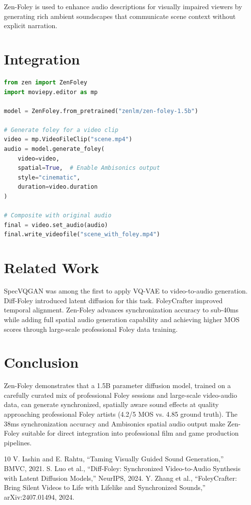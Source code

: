 \documentclass[11pt,a4paper]{article}
\begin{document}
Zen-Foley is used to enhance audio descriptions for visually impaired viewers by generating
rich ambient soundscapes that communicate scene context without explicit narration.

\section{Integration}

\begin{lstlisting}[language=Python, caption=Zen-Foley Video-Conditioned Generation]
from zen import ZenFoley
import moviepy.editor as mp

model = ZenFoley.from_pretrained("zenlm/zen-foley-1.5b")

# Generate foley for a video clip
video = mp.VideoFileClip("scene.mp4")
audio = model.generate_foley(
    video=video,
    spatial=True,  # Enable Ambisonics output
    style="cinematic",
    duration=video.duration
)

# Composite with original audio
final = video.set_audio(audio)
final.write_videofile("scene_with_foley.mp4")
\end{lstlisting}

\section{Related Work}

SpecVQGAN \cite{iashin2021taming} was among the first to apply VQ-VAE to video-to-audio
generation. Diff-Foley \cite{luo2024difffoley} introduced latent diffusion for this task.
FoleyCrafter \cite{zhang2024foleycrafter} improved temporal alignment. Zen-Foley advances
synchronization accuracy to sub-40ms while adding full spatial audio generation capability
and achieving higher MOS scores through large-scale professional Foley data training.

\section{Conclusion}

Zen-Foley demonstrates that a 1.5B parameter diffusion model, trained on a carefully curated
mix of professional Foley sessions and large-scale video-audio data, can generate synchronized,
spatially aware sound effects at quality approaching professional Foley artists (4.2/5 MOS
vs. 4.85 ground truth). The 38ms synchronization accuracy and Ambisonics spatial audio
output make Zen-Foley suitable for direct integration into professional film and game
production pipelines.

\begin{thebibliography}{10}
 V. Iashin and E. Rahtu, ``Taming Visually Guided Sound Generation,'' BMVC, 2021.
 S. Luo et al., ``Diff-Foley: Synchronized Video-to-Audio Synthesis with Latent Diffusion Models,'' NeurIPS, 2024.
 Y. Zhang et al., ``FoleyCrafter: Bring Silent Videos to Life with Lifelike and Synchronized Sounds,'' arXiv:2407.01494, 2024.
\end{thebibliography}
\end{document}
